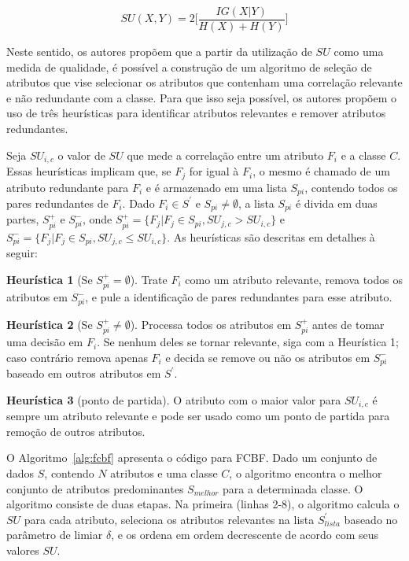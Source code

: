 \begin{equation}
SU (X,Y) = 2 \Big[\frac{IG(X|Y)}{H(X) + H(Y)}\Big]
\label{eq:simUncert}
\end{equation}

Neste sentido, os autores propõem que a partir da utilização de $SU$ como uma medida de qualidade, é possível a construção de um algoritmo de seleção de atributos que vise selecionar os atributos que contenham uma correlação relevante e não redundante com a classe. Para que isso seja possível, os autores propõem o uso de três heurísticas para identificar atributos relevantes e remover atributos redundantes. 

Seja $SU_{i,c}$ o valor de $SU$ que mede a correlação entre um atributo $F_i$ e a classe $C$. Essas heurísticas implicam que, se $F_j$ for igual à $F_i$, o mesmo é chamado de um atributo redundante para $F_i$ e é armazenado em uma lista $S_{pi}$, contendo todos os pares redundantes de $F_i$. Dado $F_i \in S^{'}$ e $S_{pi} \neq \emptyset$, a lista $S_{pi}$ é divida em duas partes, $S_{pi}^{+}$ e $S_{pi}^{-}$, onde $S_{pi}^{+} = \{ F_j | F_j \in S_{pi}, SU_{j,c} > SU_{i,c} \}$ e $S_{pi}^{-} = \{ F_j | F_j \in S_{pi}, SU_{j,c} \leq SU_{i,c} \}$. As heurísticas são descritas em detalhes à seguir:

\theoremstyle{definition}
\begin{definition}{\textbf{Heurística 1}}\label{def:fcbf_heuristica}
(Se $S_{pi}^{+} = \emptyset$). Trate $F_i$ como um atributo relevante, remova todos os atributos em $S_{pi}^{-}$, e pule a identificação de pares redundantes para esse atributo.

\textbf{Heurística 2} (Se  $S_{pi}^{+} \neq \emptyset$). Processa todos os atributos em $S_{pi}^{+}$ antes de tomar uma decisão em $F_i$. Se nenhum deles se tornar relevante, siga com a Heurística 1; caso contrário remova apenas $F_i$ e decida se remove ou não os atributos em $S_{pi}^{-}$ baseado em outros atributos em $S^{'}$.

\textbf{Heurística 3} (ponto de partida). O atributo com o maior valor para $SU_{i,c}$ é sempre um atributo relevante e pode ser usado como um ponto de partida para remoção de outros atributos.
\end{definition}

O Algoritmo~\ref{alg:fcbf} apresenta o código para FCBF. Dado um conjunto de dados $S$, contendo $N$ atributos e uma classe $C$, o algoritmo encontra o melhor conjunto de atributos predominantes $S_{melhor}$ para a determinada classe. O algoritmo consiste de duas etapas. Na primeira (linhas 2-8), o algoritmo calcula o $SU$ para cada atributo, seleciona os atributos relevantes na lista $S_{lista}^{'}$ baseado no parâmetro de limiar $\delta$, e os ordena em ordem decrescente de acordo com seus valores $SU$.

